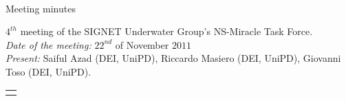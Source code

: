 \documentclass[11pt,journal,draftclsnofoot,onecolumn,twoside,letterpaper]{IEEEtran}
\theoremstyle{definition} \newtheorem{definition}[]{Definition}
\theoremstyle{theorem} \newtheorem{theorem}[]{Theorem}
\begin{document}
\pagestyle{empty}

\begin{Large} \\ \end{Large}
\begin{large} {Meeting minutes} \end{large}

\vspace{0.8cm}

 $4^{th}$ meeting of the SIGNET Underwater Group's NS-Miracle Task Force.\\
{\it Date of the meeting: } $22^{nd}$ of November $2011$\\
{\it Present: } Saiful Azad (DEI, UniPD), Riccardo Masiero (DEI, UniPD), Giovanni Toso (DEI, UniPD).

\vspace{0.5cm}

\begin{tabular}{p{}}
 \hline \\
\end{tabular}
\end{document}
